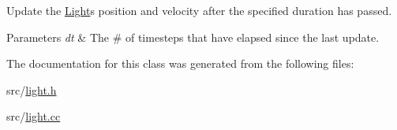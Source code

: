 Update the \hyperlink{classLight}{Light}\textquotesingle{}s position and velocity after the specified duration has passed. 


\begin{DoxyParams}{Parameters}
{\em dt} & The \# of timesteps that have elapsed since the last update. \\
\hline
\end{DoxyParams}


The documentation for this class was generated from the following files\+:\begin{DoxyCompactItemize}
\item 
src/\hyperlink{light_8h}{light.\+h}\item 
src/\hyperlink{light_8cc}{light.\+cc}\end{DoxyCompactItemize}
